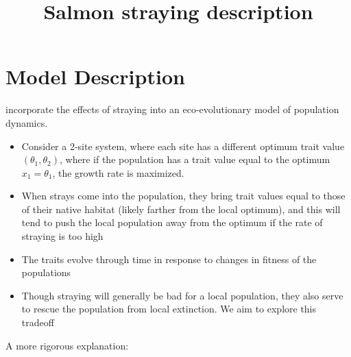 \documentclass[twocolumn,preprintnumbers,amsmath,amssymb,superscriptaddress]{revtex4}
\begin{document}
\title{Salmon straying description}



\maketitle



\section*{Model Description}

 incorporate the effects of straying into an eco-evolutionary model of population dynamics.

\begin{itemize}
\item Consider a 2-site system, where each site has a different optimum trait value $(\theta_1, \theta_2)$, where if the population has a trait value equal to the optimum $x_1=\theta_1$, the growth rate is maximized.
\item When strays come into the population, they bring trait values equal to those of their native habitat (likely farther from the local optimum), and this will tend to push the local population away from the optimum if the rate of straying is too high
\item The traits evolve through time in response to changes in fitness of the populations
\item Though straying will generally be bad for a local population, they also serve to rescue the population from local extinction. We aim to explore this tradeoff
\end{itemize}


\noindent A more rigorous explanation:
\end{document}

